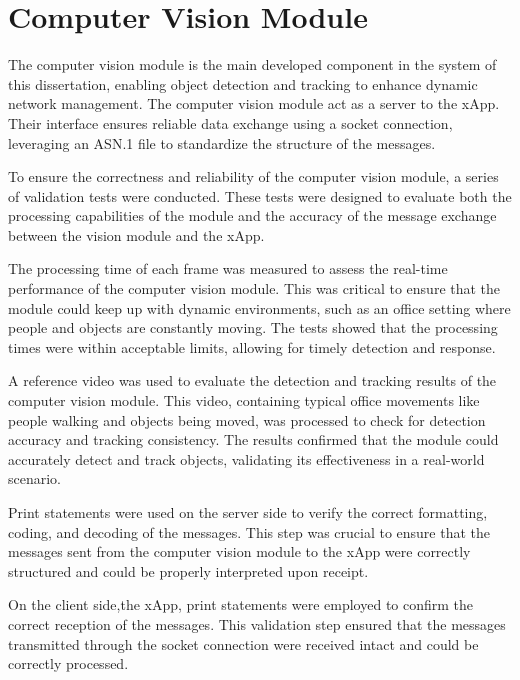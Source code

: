 \section{Computer Vision Module}\label{sec:cv_module}
The computer vision module is the main developed component in the system of this dissertation, enabling object detection and tracking to enhance dynamic network management.
The computer vision module act as a server to the xApp.
Their interface ensures reliable data exchange using a socket connection, leveraging an ASN.1 file to standardize the structure of the messages.

To ensure the correctness and reliability of the computer vision module, a series of validation tests were conducted.
These tests were designed to evaluate both the processing capabilities of the module and the accuracy of the message exchange between the vision module and the xApp.

The processing time of each frame was measured to assess the real-time performance of the computer vision module.
This was critical to ensure that the module could keep up with dynamic environments, such as an office setting where people and objects are constantly moving.
The tests showed that the processing times were within acceptable limits, allowing for timely detection and response.

A reference video was used to evaluate the detection and tracking results of the computer vision module.
This video, containing typical office movements like people walking and objects being moved, was processed to check for detection accuracy and tracking consistency.
The results confirmed that the module could accurately detect and track objects, validating its effectiveness in a real-world scenario.


Print statements were used on the server side to verify the correct formatting, coding, and decoding of the messages.
This step was crucial to ensure that the messages sent from the computer vision module to the xApp were correctly structured and could be properly interpreted upon receipt.

On the client side,the xApp, print statements were employed to confirm the correct reception of the messages.
This validation step ensured that the messages transmitted through the socket connection were received intact and could be  correctly processed.

